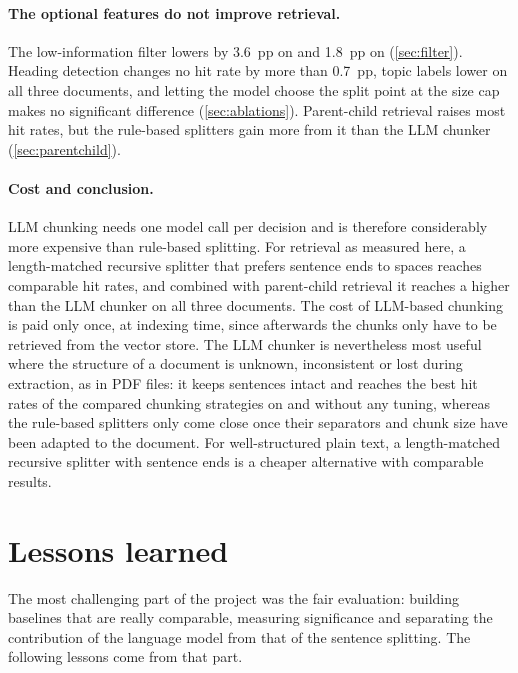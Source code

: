 \paragraph{The optional features do not improve retrieval.} The low-information filter
lowers  by 3.6~pp on  and 1.8~pp on  (\cref{sec:filter}).
Heading detection changes no hit rate by more than 0.7~pp, topic labels lower  on
all three documents, and letting the model choose the split point at the size cap makes no
significant difference (\cref{sec:ablations}). Parent-child retrieval raises most hit
rates, but the rule-based splitters gain more from it than the LLM chunker
(\cref{sec:parentchild}).

\paragraph{Cost and conclusion.} LLM chunking needs one model call per decision and is
therefore considerably more expensive than rule-based splitting. For retrieval as measured here, a length-matched recursive splitter
that prefers sentence ends to spaces reaches comparable hit rates, and combined with
parent-child retrieval it reaches a higher  than the LLM chunker on all three
documents. The cost of LLM-based chunking is paid only once, at indexing time, since
afterwards the chunks only have to be retrieved from the vector store. The LLM chunker is nevertheless most useful where the structure of a document is unknown,
inconsistent or lost during extraction, as in PDF files: it keeps sentences intact and reaches the best hit rates of the compared chunking
strategies on  and  without any tuning, whereas the rule-based splitters only come close once their separators and chunk size have been adapted to the document. For
well-structured plain text, a length-matched recursive splitter with sentence ends is a cheaper alternative with comparable results.

\section{Lessons learned}
\label{sec:lessons}

The most challenging part of the project was the fair evaluation: building baselines that
are really comparable, measuring significance and separating the contribution of the
language model from that of the sentence splitting. The following lessons come from that
part.

